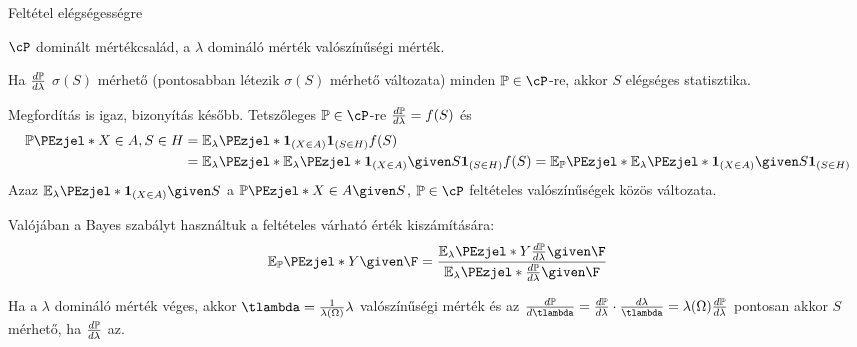 \documentclass[aspectratio=169,notheorems,9pt,\option]{beamer}
\begin{document}
\begin{frame}{Feltétel elégségességre}
  \begin{proposition}
    $\cP$ dominált mértékcsalád, a $\lambda$ domináló mérték valószínűségi mérték.
  
    Ha $\frac{d\P}{d\lambda}$ $\sigma(S)$ mérhető (pontosabban létezik $\sigma(S)$ mérhető változata) minden $\P\in\cP$-re,
    akkor $S$ elégséges statisztika.
  \end{proposition}
  \continue 
  Megfordítás is igaz, bizonyítás később. 
  \pause
  Tetszőleges $\P\in\cP$-re $\frac{d\P}{d\lambda}=f(S)$ és
  \begin{align*}
    \P{X\in A,S\in H}&=\E[\lambda]{\I{X\in A}\I{S\in H}f(S)}\\
    &=\E[\lambda]{\E[\lambda]{\I{X\in A}\given S}\I{S\in H}f(S)}
    =\E[\P]{\E[\lambda]{\I{X\in A}\given S}\I{S\in H}}
  \end{align*}
  Azaz $\E[\lambda]{\I{X\in A}\given S}$ a $\P{X\in A\given S}$, $\P\in\cP$  feltételes valószínűségek közös változata.
    
  \pause
    Valójában a Bayes szabályt használtuk a feltételes várható érték kiszámítására:
    \begin{displaymath}
      \E[\P]{Y\given \F}=\frac{\E[\lambda]{Y\frac{d\P}{d\lambda}\given \F}}{\E[\lambda]{\frac{d\P}{d\lambda}\given \F}}
    \end{displaymath}
  \pause

  Ha a $\lambda$ domináló mérték véges, akkor $\tlambda=\frac{1}{\lambda(\Omega)}\lambda$ valószínűségi mérték és az 
    $\frac{d\P}{d\tlambda}=\frac{d\P}{d\lambda}\cdot\frac{d\lambda}{\tlambda}=\lambda(\Omega)\frac{d\P}{d\lambda}$
  pontosan akkor $S$ mérhető, ha $\frac{d\P}{d\lambda}$ az.  
\end{frame}
\end{document}
